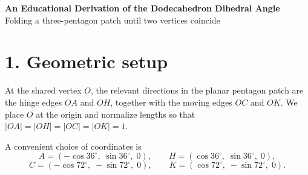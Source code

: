 \documentclass[11pt]{article}
\begin{document}
\begin{center}
    {\LARGE\bfseries An Educational Derivation of the Dodecahedron Dihedral Angle}\\[0.5em]
    {\large Folding a three-pentagon patch until two vertices coincide}\\[1em]
\end{center}

\noindent
{}

\vspace{1em}

\begin{abstract}
This note shows how a local patch of three regular pentagons already contains the dihedral angle of the regular dodecahedron. We first set up a coordinate model, then derive the exact fold angle using Rodrigues' rotation formula and a symmetry condition. We also give a numerical minimization viewpoint, which is often the most practical way to solve related folding problems computationally.
\end{abstract}

\section*{1. Geometric setup}
At the shared vertex \(O\), the relevant directions in the planar pentagon patch are the hinge edges \(OA\) and \(OH\), together with the moving edges \(OC\) and \(OK\). We place \(O\) at the origin and normalize lengths so that \(|OA|=|OH|=|OC|=|OK|=1\).

A convenient choice of coordinates is
\[
A=(-\cos 36^\circ,\; \sin 36^\circ,\; 0),
\qquad
H=(\cos 36^\circ,\; \sin 36^\circ,\; 0),
\]
\[
C=(-\cos 72^\circ,\; -\sin 72^\circ,\; 0),
\qquad
K=(\cos 72^\circ,\; -\sin 72^\circ,\; 0).
\]
\end{document}
